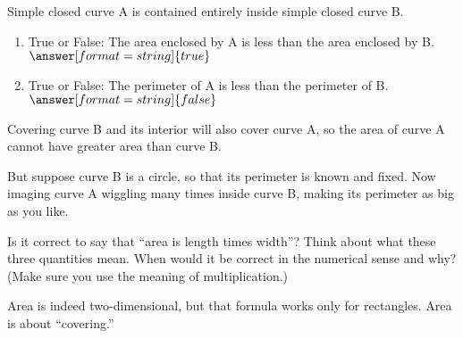 \documentclass[nooutcomes]{ximera}
\begin{document}
\begin{problem}Simple closed curve A is contained entirely inside simple closed curve B.  
\begin{enumerate}
\item True or False:  The area enclosed by A is less than the area enclosed by B. 
$\answer[format=string]{true}$
\item True or False:  The perimeter of A is less than the perimeter of B.   
$\answer[format=string]{false}$
\end{enumerate}
\begin{feedback}[correct]
Covering curve B and its interior will also cover curve A, so the area of curve A cannot have greater area than curve B. 

But suppose curve B is a circle, so that its perimeter is known and fixed.  Now imaging curve A wiggling many times inside curve B, making its perimeter as big as you like.  
\end{feedback}
\end{problem}

\begin{problem}
Is it correct to say that ``area is length times width''?  Think about what these three quantities mean.  When would it be correct in the numerical sense and why?  (Make sure you use the meaning of multiplication.)   
\begin{freeResponse}
\end{freeResponse}
\begin{hint}
Area is indeed two-dimensional, but that formula works only for rectangles.  Area is about ``covering.''
\end{hint}
\end{problem}

\end{document}
